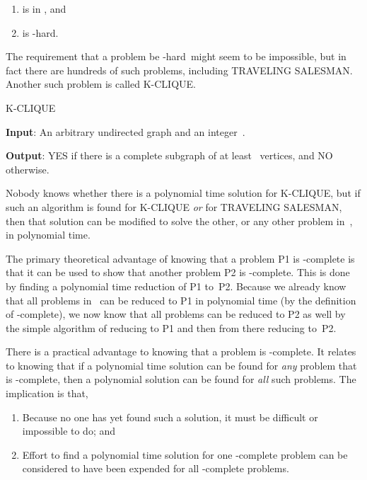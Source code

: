 \begin{enumerate}

\item
{} is in \NP, and

\item
{} is \NP-hard.

\end{enumerate}

The requirement that a problem be \NP-hard\ might seem to be
impossible, but in fact there
are hundreds of such problems, including
TRAVELING SALESMAN.
Another such problem is called K-CLIQUE.

\begin{inbox}
\noindent K-CLIQUE

{\bf Input}: An arbitrary undirected graph  and an
integer~.

{\bf Output}: YES if there is a complete subgraph of at least
~vertices, and NO otherwise.
\end{inbox}

\noindent Nobody knows whether there is a polynomial time solution for
K-CLIQUE, but if such an algorithm is found for K-CLIQUE \emph{or}
for TRAVELING SALESMAN, then that solution can be modified to solve
the other, or any other problem in~\NP, in polynomial time.

The primary theoretical advantage of knowing that a problem P1 is
\NP-com\-p\-lete is that it can be used to show that another problem
P2 is \NP-complete.
This is done by finding a polynomial time reduction of
P1 to~P2.
Because we already know that all problems in \NP\ can be reduced to P1
in polynomial time (by the definition of \NP-complete), we now know
that all problems can be reduced to P2 as well by the simple algorithm
of reducing to P1 and then from there reducing to~P2.

There is a practical advantage to knowing that a problem is
\NP-complete.
It relates to knowing that if a polynomial time solution can be found
for \emph{any} problem that is \NP-complete, then a polynomial
solution can be found for \emph{all} such problems.
The implication is that, 
\begin{enumerate}
\item
Because no one has yet found such a solution,
it must be difficult or impossible to do; and

\item
Effort to find a polynomial time solution for one
\NP-com\-plete problem can be considered to have been expended for all
\NP-complete problems.
\end{enumerate}

